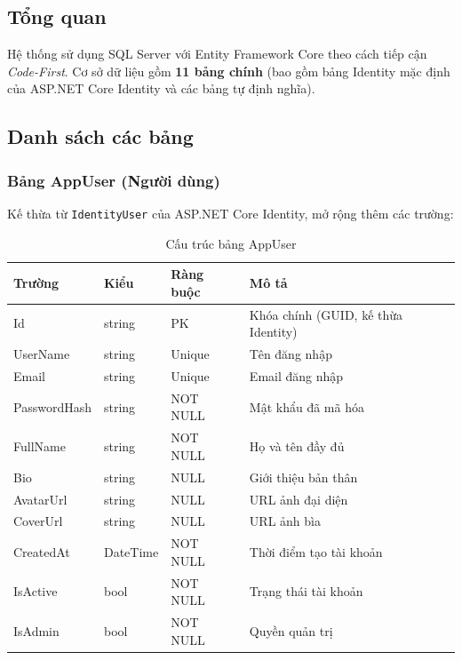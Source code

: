 \documentclass[a4paper]{article}
\begin{document}
\subsection{Tổng quan}

Hệ thống sử dụng SQL Server với Entity Framework Core theo cách tiếp cận \textit{Code-First}. Cơ sở dữ liệu gồm \textbf{11 bảng chính} (bao gồm bảng Identity mặc định của ASP.NET Core Identity và các bảng tự định nghĩa).

\subsection{Danh sách các bảng}

\subsubsection{Bảng AppUser (Người dùng)}

Kế thừa từ \texttt{IdentityUser} của ASP.NET Core Identity, mở rộng thêm các trường:

\begin{table}[h!]
\centering
\caption{Cấu trúc bảng AppUser}
\begin{tabularx}{\textwidth}{|l|l|l|X|}
\hline
\textbf{Trường} & \textbf{Kiểu} & \textbf{Ràng buộc} & \textbf{Mô tả} \\
\hline
Id & string & PK & Khóa chính (GUID, kế thừa Identity) \\
\hline
UserName & string & Unique & Tên đăng nhập \\
\hline
Email & string & Unique & Email đăng nhập \\
\hline
PasswordHash & string & NOT NULL & Mật khẩu đã mã hóa \\
\hline
FullName & string & NOT NULL & Họ và tên đầy đủ \\
\hline
Bio & string & NULL & Giới thiệu bản thân \\
\hline
AvatarUrl & string & NULL & URL ảnh đại diện \\
\hline
CoverUrl & string & NULL & URL ảnh bìa \\
\hline
CreatedAt & DateTime & NOT NULL & Thời điểm tạo tài khoản \\
\hline
IsActive & bool & NOT NULL & Trạng thái tài khoản \\
\hline
IsAdmin & bool & NOT NULL & Quyền quản trị \\
\hline
\end{tabularx}
\end{table}
\end{document}
